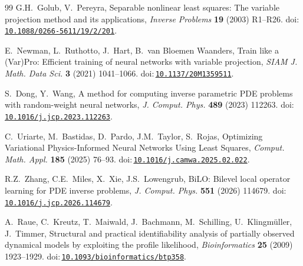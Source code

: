 \documentclass[preprint,11pt]{elsarticle}
\newcommand{\doi}[1]{doi:\,\mbox{\href{https://doi.org/#1}{\nolinkurl{#1}}}}
\begin{document}
\begin{thebibliography}{99}
G.H.~Golub, V.~Pereyra,
Separable nonlinear least squares: The variable projection method and its applications,
\textit{Inverse Problems} \textbf{19} (2003) R1--R26.
\doi{10.1088/0266-5611/19/2/201}.

E.~Newman, L.~Ruthotto, J.~Hart, B.~van Bloemen Waanders,
Train like a (Var)Pro: Efficient training of neural networks with variable projection,
\textit{SIAM J. Math. Data Sci.} \textbf{3} (2021) 1041--1066.
\doi{10.1137/20M1359511}.

S.~Dong, Y.~Wang,
A method for computing inverse parametric PDE problems with random-weight neural networks,
\textit{J. Comput. Phys.} \textbf{489} (2023) 112263.
\doi{10.1016/j.jcp.2023.112263}.

C.~Uriarte, M.~Bastidas, D.~Pardo, J.M.~Taylor, S.~Rojas,
Optimizing Variational Physics-Informed Neural Networks Using Least Squares,
\textit{Comput. Math. Appl.} \textbf{185} (2025) 76--93.
\doi{10.1016/j.camwa.2025.02.022}.

R.Z.~Zhang, C.E.~Miles, X.~Xie, J.S.~Lowengrub,
BiLO: Bilevel local operator learning for PDE inverse problems,
\textit{J. Comput. Phys.} \textbf{551} (2026) 114679.
\doi{10.1016/j.jcp.2026.114679}.

A.~Raue, C.~Kreutz, T.~Maiwald, J.~Bachmann, M.~Schilling, U.~Klingm{\"u}ller, J.~Timmer,
Structural and practical identifiability analysis of partially observed dynamical models by exploiting the profile likelihood,
\textit{Bioinformatics} \textbf{25} (2009) 1923--1929.
\doi{10.1093/bioinformatics/btp358}.

\end{thebibliography}
\end{document}
